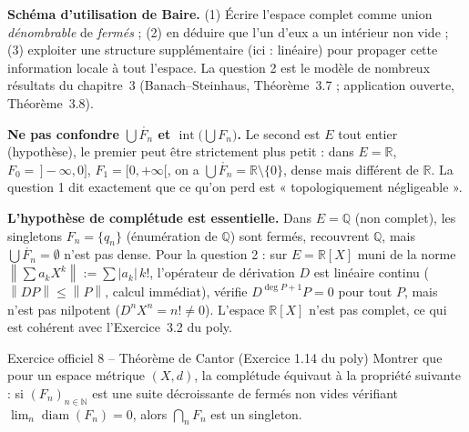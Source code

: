 \documentclass[11pt,a4paper]{article}
\newcommand{\R}{\mathbb{R}}
\newcommand{\N}{\mathbb{N}}
\newcommand{\Q}{\mathbb{Q}}
\newcommand{\interieur}[1]{\mathring{#1}}
\newcommand{\Int}{\operatorname{int}}
\newcommand{\diam}{\operatorname{diam}}
\newcommand{\norm}[1]{\left\|#1\right\|}
\theoremstyle{definition}
\begin{document}
\begin{pointcle}
\textbf{Schéma d'utilisation de Baire.} (1) Écrire l'espace complet comme union \emph{dénombrable} de \emph{fermés} ; (2) en déduire que l'un d'eux a un intérieur non vide ; (3) exploiter une structure supplémentaire (ici : linéaire) pour propager cette information locale à tout l'espace. La question 2 est le modèle de nombreux résultats du chapitre~3 (Banach--Steinhaus, Théorème~3.7 ; application ouverte, Théorème~3.8).
\end{pointcle}

\begin{piege}
\textbf{Ne pas confondre $\bigcup\interieur{F_n}$ et $\Int\big(\bigcup F_n\big)$.} Le second est $E$ tout entier (hypothèse), le premier peut être strictement plus petit : dans $E=\R$, $F_0=\,]-\infty,0]$, $F_1=[0,+\infty[$, on a $\bigcup\interieur{F_n}=\R\setminus\{0\}$, dense mais différent de $\R$. La question 1 dit exactement que ce qu'on perd est « topologiquement négligeable ».

\textbf{L'hypothèse de complétude est essentielle.} Dans $E=\Q$ (non complet), les singletons $F_n=\{q_n\}$ (énumération de $\Q$) sont fermés, recouvrent $\Q$, mais $\bigcup\interieur{F_n}=\emptyset$ n'est pas dense. Pour la question 2 : sur $E=\R[X]$ muni de la norme $\norm{\sum a_kX^k}:=\sum|a_k|\,k!$, l'opérateur de dérivation $D$ est linéaire continu ($\norm{DP}\le\norm{P}$, calcul immédiat), vérifie $D^{\deg P+1}P=0$ pour tout $P$, mais n'est pas nilpotent ($D^nX^n=n!\ne0$). L'espace $\R[X]$ n'est pas complet, ce qui est cohérent avec l'Exercice~3.2 du poly.
\end{piege}

\begin{exo}{Exercice officiel 8 -- Théorème de Cantor (Exercice 1.14 du poly)}
Montrer que pour un espace métrique $(X,d)$, la complétude équivaut à la propriété suivante : si $(F_n)_{n\in\N}$ est une suite décroissante de fermés non vides vérifiant $\lim_n\diam(F_n)=0$, alors $\bigcap_nF_n$ est un singleton.
\end{exo}
\end{document}
